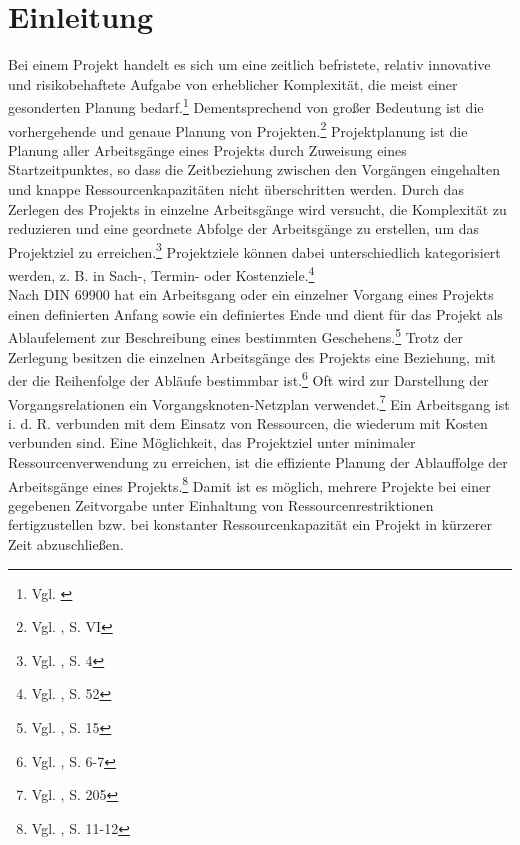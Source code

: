 \documentclass[a4paper,12pt,parskip,bibtotoc,liststotoc]{article}
\begin{document}

\section{Einleitung} \label{start}
Bei einem Projekt handelt es sich um eine zeitlich befristete, relativ innovative und risikobehaftete Aufgabe von erheblicher Komplexität, die meist einer gesonderten Planung bedarf.\footnote{Vgl. \cite{projektdef}} Dementsprechend von großer Bedeutung ist die vorhergehende und genaue Planung von Projekten.\footnote{Vgl. \cite{zimmermann2006projektplanung}, S. VI\label{zum}} Projektplanung ist die Planung aller Arbeitsgänge eines Projekts durch Zuweisung eines Startzeitpunktes, so dass die Zeitbeziehung zwischen den Vorgängen eingehalten und knappe Ressourcenkapazitäten nicht überschritten werden. Durch das Zerlegen des Projekts in einzelne Arbeitsgänge wird versucht, die Komplexität zu reduzieren und eine geordnete Abfolge der Arbeitsgänge zu erstellen, um das Projektziel zu erreichen.\footnote{Vgl. \cite{zimmermann2006projektplanung}, S. 4} Projektziele können dabei unterschiedlich kategorisiert werden, z. B. in Sach-, Termin- oder Kostenziele.\footnote{Vgl. \cite{felkai2011analysieren}, S. 52}\\

Nach DIN 69900 hat ein Arbeitsgang oder ein einzelner Vorgang eines Projekts einen definierten Anfang sowie ein definiertes Ende und dient für das Projekt als Ablaufelement zur Beschreibung eines bestimmten Geschehens.\footnote{Vgl. \cite{69900D}, S. 15} Trotz der Zerlegung besitzen die einzelnen Arbeitsgänge des Projekts eine Beziehung, mit der die Reihenfolge der Abläufe bestimmbar ist.\footnote{Vgl. \cite{kellenbrink2014einfuhrung}, S. 6-7} Oft wird zur Darstellung der Vorgangsrelationen ein Vorgangsknoten-Netzplan verwendet.\footnote{Vgl. \cite{Helber}, S. 205} %
Ein Arbeitsgang ist i. d. R. verbunden mit dem Einsatz von Ressourcen, die wiederum mit Kosten verbunden sind. Eine Möglichkeit, das Projektziel unter minimaler Ressourcenverwendung zu erreichen, ist die effiziente Planung der Ablauffolge der Arbeitsgänge eines Projekts.\footnote{Vgl. \cite{bartels2009projektplanung}, S. 11-12} Damit ist es möglich, mehrere Projekte bei einer gegebenen Zeitvorgabe unter Einhaltung von Ressourcenrestriktionen fertigzustellen bzw. bei konstanter Ressourcenkapazität ein Projekt in kürzerer Zeit abzuschließen. \\
\end{document}
